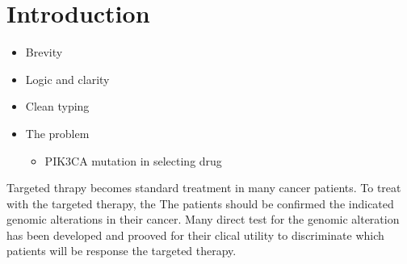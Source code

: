 \documentclass[10pt,letterpaper]{article}
\newcommand{\getIndex}[2]{
  \ForEach{,}{\IfEq{#1}{\thislevelitem}{\number\thislevelcount\ExitForEach}{}}{#2}
}
\newcommand{\getAff}[1]{
  \getIndex{#1}{}
}
\providecommand{\tightlist}{%
  \setlength{\itemsep}{0pt}\setlength{\parskip}{0pt}}
\begin{document}
\vspace*{0.2in}



\linenumbers

\hypertarget{introduction}{%
\section{Introduction}\label{introduction}}

\begin{itemize}
\item
  Brevity
\item
  Logic and clarity
\item
  Clean typing
\item
  The problem

  \begin{itemize}
  \tightlist
  \item
    PIK3CA mutation in selecting drug
  \end{itemize}
\end{itemize}

Targeted thrapy becomes standard treatment in many cancer patients. To
treat with the targeted therapy, the The patients should be confirmed
the indicated genomic alterations in their cancer. Many direct test for
the genomic alteration has been developed and prooved for their clical
utility to discriminate which patients will be response the targeted
therapy.
\end{document}
